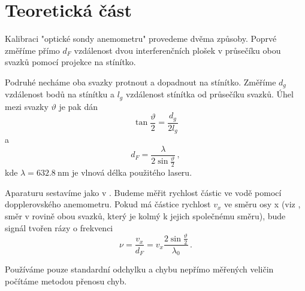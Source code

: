 \section*{Teoretická část}
Kalibraci "optické sondy anemometru" provedeme dvěma způsoby.
Poprvé změříme přímo $d_F$ vzdálenost dvou interferenčních plošek v průsečíku obou svazků pomocí projekce na stínítko.


Podruhé necháme oba svazky protnout a dopadnout na stínítko. Změříme $d_g$ vzdálenost bodů na stínítku a $l_g$ vzdálenost stínítka od průsečíku svazků. Úhel mezi svazky $\vartheta$ je pak dán
\begin{equation}
\label{eq:kal_geom}
\tan \frac{\vartheta}{2}=\frac{d_g}{2 l_g}
\end{equation}
a
\begin{equation}
\label{eq:kal_inter}
d_F=\frac{\lambda}{2 \sin\frac{\vartheta}{2}} \,,
\end{equation}
kde $\lambda = \SI{632.8}{\nm}$ je vlnová délka použitého laseru.

Aparaturu sestavíme jako v \cite{skripta}. Budeme měřit rychlost částic ve vodě pomocí dopplerovského anemometru. Pokud má částice rychlost $v_x$ ve směru osy x (viz \cite{skripta}, směr v rovině obou svazků, který je kolmý k jejich společnému směru), bude signál tvořen rázy o frekvenci
\begin{equation}
\nu = \frac{v_x}{d_F} = v_x \frac{2\sin\frac{\vartheta}{2}}{\lambda_0} \,.
\end{equation}

Používáme pouze standardní odchylku a chybu nepřímo měřených veličin počítáme metodou přenosu chyb.